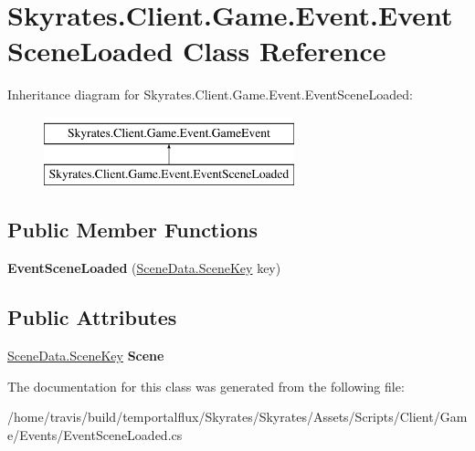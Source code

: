 \hypertarget{class_skyrates_1_1_client_1_1_game_1_1_event_1_1_event_scene_loaded}{\section{Skyrates.\-Client.\-Game.\-Event.\-Event\-Scene\-Loaded Class Reference}
\label{class_skyrates_1_1_client_1_1_game_1_1_event_1_1_event_scene_loaded}
}
Inheritance diagram for Skyrates.\-Client.\-Game.\-Event.\-Event\-Scene\-Loaded\-:\begin{figure}[H]
\begin{center}
\leavevmode
\includegraphics[height=2.000000cm]{class_skyrates_1_1_client_1_1_game_1_1_event_1_1_event_scene_loaded}
\end{center}
\end{figure}
\subsection*{Public Member Functions}
\begin{DoxyCompactItemize}
\item 
\hypertarget{class_skyrates_1_1_client_1_1_game_1_1_event_1_1_event_scene_loaded_a626a0f186114b9ebd5684238e1157319}{{\bfseries Event\-Scene\-Loaded} (\hyperlink{class_scene_data_a79d397b3deef242a865470283d96f2e6}{Scene\-Data.\-Scene\-Key} key)}\label{class_skyrates_1_1_client_1_1_game_1_1_event_1_1_event_scene_loaded_a626a0f186114b9ebd5684238e1157319}

\end{DoxyCompactItemize}
\subsection*{Public Attributes}
\begin{DoxyCompactItemize}
\item 
\hypertarget{class_skyrates_1_1_client_1_1_game_1_1_event_1_1_event_scene_loaded_af842f8c33a313b1eee1e07ab89816d61}{\hyperlink{class_scene_data_a79d397b3deef242a865470283d96f2e6}{Scene\-Data.\-Scene\-Key} {\bfseries Scene}}\label{class_skyrates_1_1_client_1_1_game_1_1_event_1_1_event_scene_loaded_af842f8c33a313b1eee1e07ab89816d61}

\end{DoxyCompactItemize}


The documentation for this class was generated from the following file\-:\begin{DoxyCompactItemize}
\item 
/home/travis/build/temportalflux/\-Skyrates/\-Skyrates/\-Assets/\-Scripts/\-Client/\-Game/\-Events/Event\-Scene\-Loaded.\-cs\end{DoxyCompactItemize}
